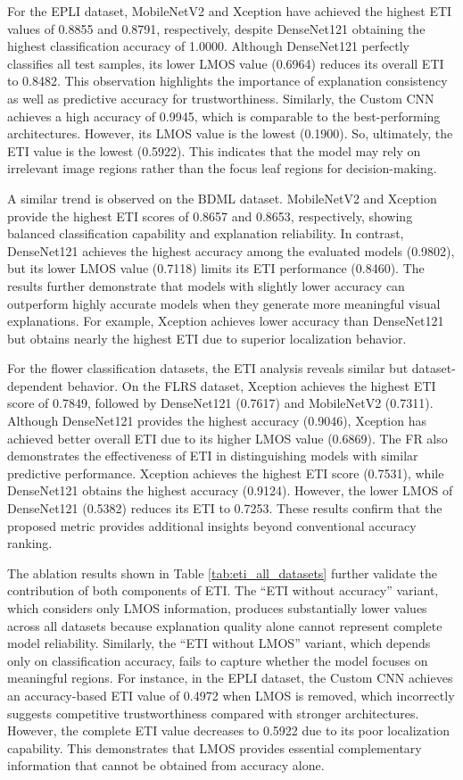 \documentclass[a4paper,fleqn]{cas-dc}
\begin{document}
For the EPLI dataset, MobileNetV2 and Xception have achieved the highest ETI values of 0.8855 and 0.8791, respectively, despite DenseNet121 obtaining the highest classification accuracy of 1.0000. Although DenseNet121 perfectly classifies all test samples, its lower LMOS value (0.6964) reduces its overall ETI to 0.8482. This observation highlights the importance of explanation consistency as well as predictive accuracy for trustworthiness. Similarly, the Custom CNN achieves a high accuracy of 0.9945, which is comparable to the best-performing architectures. However, its LMOS value is the lowest (0.1900). So, ultimately, the ETI value is the lowest (0.5922). This indicates that the model may rely on irrelevant image regions rather than the focus leaf regions for decision-making.

A similar trend is observed on the BDML dataset. MobileNetV2 and Xception provide the highest ETI scores of 0.8657 and 0.8653, respectively, showing balanced classification capability and explanation reliability. In contrast, DenseNet121 achieves the highest accuracy among the evaluated models (0.9802), but its lower LMOS value (0.7118) limits its ETI performance (0.8460). The results further demonstrate that models with slightly lower accuracy can outperform highly accurate models when they generate more meaningful visual explanations. For example, Xception achieves lower accuracy than DenseNet121 but obtains nearly the highest ETI due to superior localization behavior.

For the flower classification datasets, the ETI analysis reveals similar but dataset-dependent behavior. On the FLRS dataset, Xception achieves the highest ETI score of 0.7849, followed by DenseNet121 (0.7617) and MobileNetV2 (0.7311). Although DenseNet121 provides the highest accuracy (0.9046), Xception has achieved better overall ETI due to its higher LMOS value (0.6869). The FR also demonstrates the effectiveness of ETI in distinguishing models with similar predictive performance. Xception achieves the highest ETI score (0.7531), while DenseNet121 obtains the highest accuracy (0.9124). However, the lower LMOS of DenseNet121 (0.5382) reduces its ETI to 0.7253. These results confirm that the proposed metric provides additional insights beyond conventional accuracy ranking.

The ablation results shown in Table \ref{tab:eti_all_datasets} further validate the contribution of both components of ETI. The ``ETI without accuracy'' variant, which considers only LMOS information, produces substantially lower values across all datasets because explanation quality alone cannot represent complete model reliability. Similarly, the ``ETI without LMOS'' variant, which depends only on classification accuracy, fails to capture whether the model focuses on meaningful regions. For instance, in the EPLI dataset, the Custom CNN achieves an accuracy-based ETI value of 0.4972 when LMOS is removed, which incorrectly suggests competitive trustworthiness compared with stronger architectures. However, the complete ETI value decreases to 0.5922 due to its poor localization capability. This demonstrates that LMOS provides essential complementary information that cannot be obtained from accuracy alone.
\end{document}
